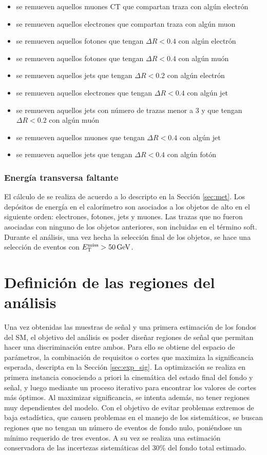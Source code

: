 \begin{itemize}
  \item se remueven aquellos muones CT que compartan traza con algún electrón
  \item se remueven aquellos electrones que compartan traza con algún muon
  \item se remueven aquellos fotones que tengan $\Delta R<0.4$ con algún electrón
  \item se remueven aquellos fotones que tengan $\Delta R<0.4$ con algún muón
  \item se remueven aquellos jets que tengan $\Delta R<0.2$ con algún electrón
  \item se remueven aquellos electrones que tengan $\Delta R<0.4$ con algún jet
  \item se remueven aquellos jets con número de trazas menor a 3 y que tengan $\Delta R<0.2$ con algún muón
  \item se remueven aquellos muones que tengan $\Delta R<0.4$ con algún jet
  \item se remueven aquellos jets que tengan $\Delta R<0.4$ con algún fotón
\end{itemize}


\subsubsection{Energía transversa faltante}

El cálculo de \met se realiza de acuerdo a lo descripto en la Sección \ref{sec:met}. Los depósitos de energía en el calorímetro son asociados a los objetos de alto \pt en el siguiente orden: electrones, fotones, jets y muones. Las trazas que no fueron asociadas con ninguno de los objetos anteriores, son incluidas en el término soft. Durante el análisis, una vez hecha la selección final de los objetos, se hace una selección de eventos con $E_{\text{T}}^{\text{miss}}>50\,\text{GeV}$.


\section{Definición de las regiones del análisis}

Una vez obtenidas las muestras de señal y una primera estimación de los fondos del SM, el objetivo del análisis es poder diseñar regiones de señal que permitan hacer una discriminación entre ambos. Para ello se obtiene del espacio de parámetros, la combinación de requisitos o cortes que maximiza la significancia esperada, descripta en la Sección \ref{sec:exp_sig}.
La optimización se realiza en primera instancia conociendo a priori la cinemática del estado final del fondo y señal, y luego mediante un proceso iterativo para encontrar los valores de cortes más óptimos. Al maximizar significancia, se intenta además, no tener regiones muy dependientes del modelo. Con el objetivo de evitar problemas extremos de baja estadística, que causen problemas en el manejo de los sistemáticos, se buscan regiones que no tengan un número de eventos de fondo nulo, poniéndose un mínimo requerido de tres eventos. A su vez se realiza una estimación conservadora de las incertezas sistemáticas del 30\% del fondo total estimado.

